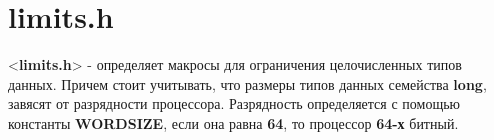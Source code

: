 \documentclass[12pt, letterpaper]{article}
\begin{document}
\section{limits.h}
<\textbf{limits.h}> - определяет макросы для ограничения целочисленных типов данных.
Причем стоит учитывать, что размеры типов данных семейства \textbf{long}, завясят от разрядности процессора.
Разрядность определяется с помощью константы \textbf{WORDSIZE}, если она равна \textbf{64}, то процессор \textbf{64-х} битный.
\end{document}
